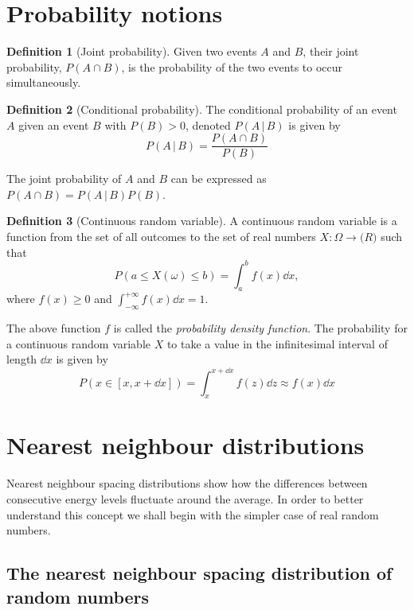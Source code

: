 \documentclass[../thesis.tex]{subfiles}
\theoremstyle{definition}
\newtheorem*{def*}{Definition}
\begin{document}
\section{Probability notions}

\begin{def*}[Joint probability]
  Given two events $A$ and $B$, their joint probability, \(P(A \cap B)\), is
  the probability of the two events to occur simultaneously.
\end{def*}

\begin{def*}[Conditional probability]
  The conditional probability of an event $A$ given an event $B$ with \(P(B)>0\),
  denoted \(P(A\,|\,B)\) is given by
  \[
    P(A\,|\,B) = \frac{P(A \cap B)}{P(B)}
  \]
\end{def*}

The joint probability of $A$ and $B$ can be expressed as
\(P(A \cap B) = P(A\,|\,B) P(B)\).

\begin{def*}[Continuous random variable]
  A continuous random variable is a function from the set of all outcomes to the
  set of real numbers \(X:\Omega \to \mathbb(R)\) such that
  \[
    P(a \leq X(\omega) \leq b) = \int_a^b f(x) \dd{x},
  \]
  where \(f(x) \geq 0\) and \(\int_{-\infty}^{+\infty}f(x)\dd{x}=1\).
\end{def*}
The above function \(f\) is called the \emph{probability density function}.
The probability for a continuous random variable $X$ to take a value in the
infinitesimal interval of length \(\dd{x}\) is given by
\begin{equation}
  \label{eq:prob-rv-in-int}
  P(x \in [x, x + \dd{x}]) = \int_x^{x+\dd{x}} f(z) \dd{z} \approx f(x)\dd{x}
\end{equation}


\section{Nearest neighbour distributions}


Nearest neighbour spacing distributions show how the differences
between consecutive energy levels fluctuate around the average.
In order to better understand this concept we shall begin with the simpler
case of real random numbers.

\subsection{The nearest neighbour spacing distribution of random numbers}
\end{document}
